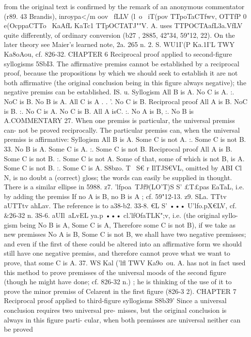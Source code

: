 {from the original text is confirmed by the remark of an anonymous
commentator (r89. 43 Brandis), inroypa</m oov ~fLLV (l~o~ iT(pov
TTpoTaCTfwv, OTTfP 0 e(OcppaCTTo~ KaAfL KaTc1 TTpOCTATJ""V. A. uses
TTPOCTAafL{3a.VfLV quite differently, of ordinary conversion (b27 , 2885,
42"34, 59"12, 22). On the later theory see Maier's learned note,
2a. 265 n. 2.
S. WU1I'(P Ka.1I'L TWY Ka8oAou, cf. 826-32.
CHAPTER 6
Reciprocal proof applied to second-figure syllogisms
5SbI3. The affirmative premiss cannot be established by a
reciprocal proof, because the propositions by which we should seek
to establish it are not both affirmative (the original conclusion
being in this figure always negative); the negative premiss can be
established.
IS.
u.
Syllogism
All B is A.
No C is A.
:. NoC is B.
No B is A.
All C is A .
. '. No C is B.
Reciprocal proof
All A is B.
NoC is B.
:. No C is A.
No C is B.
All A isC.
:. No A is B, :. No B is A.COMMENTARY
27. When one premiss is particular, the universal premiss can-
not be proved reciprocally. The particular premiss can, when the
universal premiss is affirmative:
Syllogism
All B is A.
Some C is not A.
:. Some C is not B.
33.
No B is A.
Some C is A.
:. Some C is not B.
Reciprocal proof
All A is B.
Some C is not B.
:. Some C is not A.
Some of that, some of which is not B, is A.
Some C is not B.
:. Some C is A.
S8bzo. T~ S€ r IlTJS€VL, omitted by ABI Cl N, is no doubt a
(correct) gloss; the words can easily be supplied in thought.
There is a similar ellipse in 5988.
z7. 'lfpoa~TJf9(LO'T)S S' £T£pas EaTaL, i.e. by adding the premiss
If no A is B, no B is A ; cf. 59"12-13.
z9. SLa. TTtv aUTTtv ahLav. The reference is to a38-b2.
33-8. €L S' ••• U'lfo.pX€LV, cf. &26-32 n.
3S-6. aUIl~aLvEL ya.p ••• cl.'lfOfaTLK";v, i.e. (the original syllo-
gism being No B is A, Some C is A, Therefore some C is not B),
if we take as new premisses No A is B, Some C is not B, we shall
have two negative premisses; and even if the first of these could
be altered into an affirmative form we should still have one
negative premiss, and therefore cannot prove what we want to
prove, that some C is A.
37. WS Kal ('lfl TWV Ka9o~ou. A. has not in fact used this method
to prove premisses of the universal moods of the second figure
(though he might have done; cf. 826-32 n.) ; he is thinking of the
use of it to prove the minor premiss of Celarent in the first figure
(826-3 2).
CHAPTER 7
Reciprocal proof applied to third-figure syllogisms
S8b39' Since a universal conclusion requires two universal pre-
misses, but the original conclusion is always in this figure parti-
cular, when both premisses are universal neither can be proved
}}
